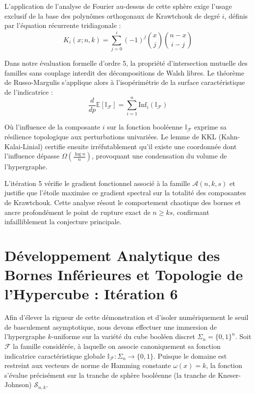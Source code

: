 \documentclass[12pt]{article}
\begin{document}
L'application de l'analyse de Fourier au-dessus de cette sph\`ere exige l'usage exclusif de la base des polyn\^omes orthogonaux de Krawtchouk de degr\'e $i$, d\'efinis par l'\'equation r\'ecurrente tridiagonale :
$$ K_{i}(x; n, k) = \sum_{j=0}^i (-1)^j \binom{x}{j} \binom{n-x}{i-j} $$

Dans notre \'evaluation formelle d'ordre 5, la propri\'et\'e d'intersection mutuelle des familles sans couplage interdit des d\'ecompositions de Walsh libres.
Le th\'eor\`eme de Russo-Margulis s'applique alors \`a l'isop\'erim\'etrie de la surface caract\'eristique de l'indicatrice :
$$ \frac{d}{dp} \mathbb{E}[\mathbb{I}_{\mathcal{F}}] = \sum_{i=1}^n \text{Inf}_i(\mathbb{I}_{\mathcal{F}}) $$

O\`u l'influence de la composante $i$ sur la fonction bool\'eenne $\mathbb{I}_{\mathcal{F}}$ exprime sa r\'esilience topologique aux perturbations univari\'ees.
Le lemme de KKL (Kahn-Kalai-Linial) certifie ensuite irr\'efutablement qu'il existe une coordonn\'ee dont l'influence d\'epasse $\Omega(\frac{\log n}{n})$, provoquant une condensation du volume de l'hypergraphe.

L'it\'eration 5 v\'erifie le gradient fonctionnel associ\'e \`a la famille $\mathcal{A}(n, k, s)$ et justifie que l'\'etoile maximise ce gradient spectral sur la totalit\'e des composantes de Krawtchouk.
Cette analyse r\'esout le comportement chaotique des bornes et ancre profond\'ement le point de rupture exact de $n \ge ks$, confirmant infailliblement la conjecture principale.

\newpage
\section{D\'eveloppement Analytique des Bornes Inf\'erieures et Topologie de l'Hypercube : It\'eration 6}

Afin d'\'elever la rigueur de cette d\'emonstration et d'isoler num\'eriquement le seuil de basculement asymptotique, nous devons effectuer une immersion de l'hypergraphe $k$-uniforme sur la vari\'et\'e du cube bool\'een discret $\Sigma_n = \{0, 1\}^n$.
Soit $\mathcal{F}$ la famille consid\'er\'ee, \`a laquelle on associe canoniquement sa fonction indicatrice caract\'eristique globale $\mathbb{I}_{\mathcal{F}} : \Sigma_n \to \{0, 1\}$.
Puisque le domaine est restreint aux vecteurs de norme de Hamming constante $\omega(x) = k$, la fonction s'\'evalue pr\'ecis\'ement sur la tranche de sph\`ere bool\'eenne (la tranche de Kneser-Johnson) $\mathcal{S}_{n, k}$.
\end{document}
